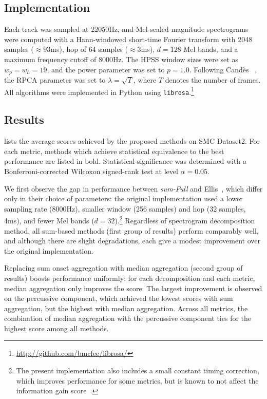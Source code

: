 \documentclass{article}
\begin{document}
\subsection{Implementation}
Each track was sampled at 22050Hz, and Mel-scaled magnitude spectrograms were computed 
with a Hann-windowed short-time Fourier transform with 2048 samples ($\approx93$ms), hop 
of 64 samples ($\approx3$ms), $d=128$ Mel bands, and a maximum frequency cutoff of 8000Hz.
The HPSS window sizes were set as $w_p = w_h = 19$, and the power parameter was set 
to $p=1.0$.
Following Cand\`{e}s \etal~\cite{candes2011robust}, the RPCA parameter was set to
${\lambda = \sqrt{T}}$, where $T$ denotes the number of frames.
All algorithms were implemented in Python using \texttt{librosa}.\footnote{\url{http://github.com/bmcfee/librosa/}}

\subsection{Results}

 lists the average scores achieved by the proposed methods on
SMC Dataset2.
For each metric, methods which achieve statistical equivalence to the best performance are listed in bold.
Statistical significance was determined with a Bonferroni-corrected Wilcoxon signed-rank test at level $\alpha=0.05$.

We first observe the gap in performance between \emph{sum-Full} and 
Ellis~\cite{ellis2007beat}, which differ only in their choice of parameters: the 
original implementation used a lower sampling rate (8000Hz), smaller window (256 samples) 
and hop (32 samples, 4ms), and fewer Mel bands ($d=32$).\footnote{The present
implementation also includes a small constant timing correction, which improves 
performance for some metrics, but is known to not affect the information gain
score~\cite{davies2009evaluation}.}
Regardless of spectrogram decomposition method, all sum-based methods (first group of 
results) perform comparably well, and although there are slight degradations, each give 
a modest improvement over the original implementation.

Replacing sum onset aggregation with median aggregation (second group of results)
boosts performance uniformly: for each decomposition and each metric, median
aggregation only improves the score.  The largest improvement is observed on the
percussive component, which achieved the lowest scores with sum aggregation, but the
highest with median aggregation. Across all metrics, the combination of median aggregation with 
the percussive component ties for the highest score among all methods.
\end{document}
